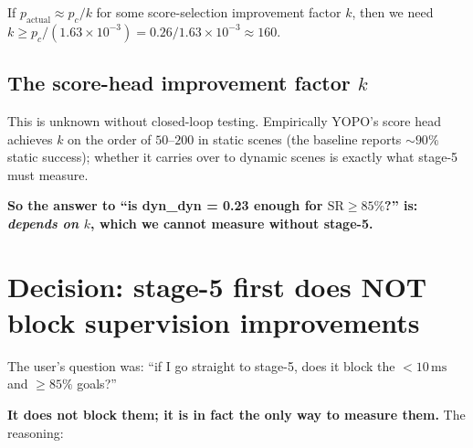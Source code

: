 \documentclass[11pt]{article}
\newcommand{\ms}{\,\text{ms}}
\begin{document}
If $p_{\text{actual}} \approx p_c/k$ for some score-selection improvement
factor $k$, then we need $k \ge p_c / (1.63\times 10^{-3}) = 0.26 / 1.63\times 10^{-3}
\approx 160$.

\subsection{The score-head improvement factor $k$}

This is unknown without closed-loop testing. Empirically YOPO's score head
achieves $k$ on the order of $50$--$200$ in static scenes (the baseline
reports $\sim$$90\%$ static success); whether it carries over to dynamic
scenes is exactly what stage-5 must measure.

\textbf{So the answer to ``is dyn\_dyn = 0.23 enough for $\text{SR} \geq 85\%$?''
is: \emph{depends on $k$}, which we cannot measure without stage-5.}

\section{Decision: stage-5 first does NOT block supervision improvements}

The user's question was: ``if I go straight to stage-5, does it block the
$<10\ms$ and $\geq 85\%$ goals?''

\textbf{It does not block them; it is in fact the only way to measure them.}
The reasoning:
\end{document}
